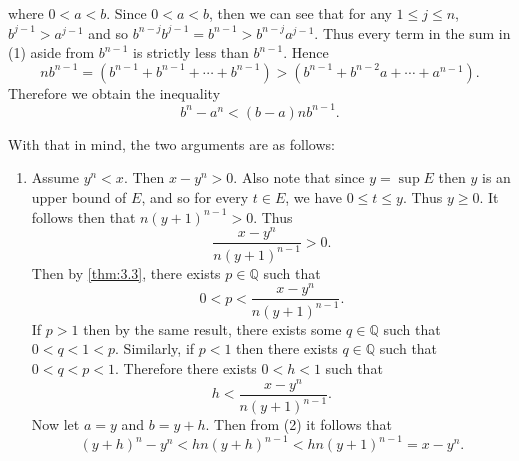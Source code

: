 \documentclass[leqno]{article}
\makeatletter
\theoremstyle{definition}
\theoremstyle{remark}
\let\oldproofname=\proofname
\renewcommand{\proofname}{\bf{\textit{\oldproofname}}}
\renewenvironment{proof}[1][\proofname]{\par
  \pushQED{\qed}%
  \normalfont \topsep6\p@\@plus6\p@\relax
  \list{}{\leftmargin=0mm
          \rightmargin=0mm
          \settowidth{\itemindent}{\itshape#1}%
          \labelwidth=4mm
          \parsep=0pt \listparindent=0mm%
  }
  \item[\hskip\labelsep
        \itshape
    #1\@addpunct{.}]\ignorespaces
}{%
  \popQED\endlist\@endpefalse
}
\makeatother
\begin{document}
\begin{proof}
\begin{equation}
                    \end{equation}
                where $0<a<b$. Since $0<a<b$, then we can see that for any $1\leq j\leq n$, $b^{j-1}>a^{j-1}$ and so $b^{n-j}b^{j-1}=b^{n-1}>b^{n-j}a^{j-1}$. Thus every term in the sum in (1) aside from $b^{n-1}$ is strictly less than $b^{n-1}$. Hence
                    \begin{equation*}
                        nb^{n-1}=(b^{n-1}+b^{n-1}+\cdots+b^{n-1})>(b^{n-1}+b^{n-2}a+\cdots+a^{n-1}).
                    \end{equation*}
                Therefore we obtain the inequality
                    \begin{equation}
                        b^n-a^n<(b-a)nb^{n-1}.
                    \end{equation}
                \par
                With that in mind, the two arguments are as follows:
                    \begin{enumerate}
                        \item Assume $y^n<x$. Then $x-y^n>0$. Also note that since $y=\sup E$ then $y$ is an upper bound of $E$, and so for every $t\in E$, we have $0\leq t\leq y$. Thus $y\geq 0$. It follows then that $n(y+1)^{n-1}>0$. Thus
                            \begin{equation*}
                                \frac{x-y^n}{n(y+1)^{n-1}}>0.
                            \end{equation*}
                        Then by \cref{thm:3.3}, there exists $p\in\mathbb{Q}$ such that 
                            \begin{equation*}
                                0<p<\frac{x-y^n}{n(y+1)^{n-1}}.
                            \end{equation*} 
                        If $p>1$ then by the same result, there exists some $q\in\mathbb{Q}$ such that $0<q<1<p$. Similarly, if $p<1$ then there exists $q\in\mathbb{Q}$ such that $0<q<p<1$. Therefore there exists $0<h<1$ such that 
                            \begin{equation*}
                                h<\frac{x-y^n}{n(y+1)^{n-1}}.
                            \end{equation*}
                        Now let $a=y$ and $b=y+h$. Then from (2) it follows that
                            \begin{equation}
                                (y+h)^n-y^n<hn(y+h)^{n-1}<hn(y+1)^{n-1}=x-y^n.
                            \end{equation}

\end{enumerate}
\end{proof}
\end{document}
